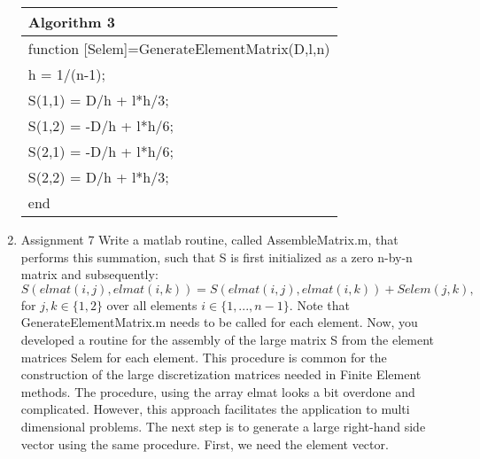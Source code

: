 \documentclass[a4paper,10pt]{report}
\begin{document}
\begin{enumerate}
\begin{table}
\begin{tabular}{ |l| } 
\hline
\textbf{Algorithm 3}\\
\hline
\hspace{0.5cm}function [Selem]=GenerateElementMatrix(D,l,n)\\
\hspace{1cm}h = 1/(n-1);\\
\hspace{1cm}S(1,1) = D/h + l*h/3;\\
\hspace{1cm}S(1,2) = -D/h + l*h/6;\\
\hspace{1cm}S(2,1) = -D/h + l*h/6;\\
\hspace{1cm}S(2,2) = D/h + l*h/3;\\
\hspace{0.5cm}end\\
\hline
\end{tabular}
\end{table}

\item{Assignment 7} Write a matlab routine, called AssembleMatrix.m, that performs
this summation, such that S is first initialized as a zero n-by-n matrix
and subsequently:\\
\begin{equation} \label{eq:6}
 S(elmat(i, j), elmat(i, k)) = S(elmat(i, j), elmat(i, k)) + Selem(j, k),
\end{equation}
for $ j, k \in \{1, 2\}$ over all elements $i \in \{1, . . . , n − 1\}$. Note that GenerateElementMatrix.m
needs to be called for each element.
Now, you developed a routine for the assembly of the large matrix S from
the element matrices Selem for each element. This procedure is common
for the construction of the large discretization matrices needed in Finite
Element methods. The procedure, using the array elmat looks a bit overdone
and complicated. However, this approach facilitates the application to multi
dimensional problems. The next step is to generate a large right-hand side
vector using the same procedure. First, we need the element vector.


\end{enumerate}
\end{document}
